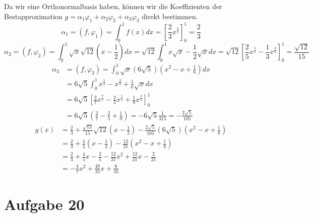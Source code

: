 \documentclass[10pt,a4paper]{article}
\begin{document}
Da wir eine Orthonormalbasis haben, können wir die Koeffizienten der Bestapproximation $g = \alpha_{1} \varphi_{1} + \alpha_{2} \varphi_{2} + \alpha_{3} \varphi_{3}$ direkt bestimmen.
\begin{equation}
  \alpha_{1} = (f, \varphi_{1}) = \int_{0}^{1} f(x) dx = [\frac{2}{3}x^{\frac{3}{2}}]_{0}^{1} = \frac{2}{3}
\end{equation}
\begin{equation}
  \alpha_{2} = (f, \varphi_{2}) = \int_{0}^{1} \sqrt{x}\sqrt{12}(x - \frac{1}{2}) dx = \sqrt{12} \int_{0}^{1} x \sqrt{x} - \frac{1}{2} \sqrt{x} dx = \sqrt{12} [\frac{2}{5}x^{\frac{5}{2}} - \frac{1}{3}x^{\frac{3}{2}}]_{0}^{1} = \frac{\sqrt{12}}{15}
\end{equation}
\begin{align*}
  \alpha_{3} & = (f, \varphi_{3}) = \int_{0}^{1} \sqrt{x}(6 \sqrt{5})(x^{2} - x + \frac{1}{6}) dx\\
  & = 6 \sqrt{5} \int_{0}^{1} x^{\frac{5}{2}} - x^{\frac{3}{2}} + \frac{1}{6} \sqrt{x} dx\\
  & = 6 \sqrt{5} [\frac{2}{7}x^{\frac{7}{2}} - \frac{2}{5} x^{\frac{5}{2}} + \frac{1}{9} x^{\frac{3}{2}}]_{0}^{1}\\
  & = 6 \sqrt{5} (\frac{2}{7} - \frac{2}{5} + \frac{1}{9}) = -6 \sqrt{5} \frac{1}{315} = -\frac{2 \sqrt{5}}{105}
\end{align*}
\begin{align*}
  g(x) & = \frac{2}{3} + \frac{\sqrt{12}}{15} \sqrt{12}(x - \frac{1}{2}) - \frac{2 \sqrt{5}}{105}(6 \sqrt{5})(x^{2} - x + \frac{1}{6})\\
  & = \frac{2}{3} + \frac{4}{5}(x - \frac{1}{2}) - \frac{12}{21}(x^{2} - x + \frac{1}{6})\\
  & = \frac{2}{3} + \frac{4}{5}x - \frac{2}{5} - \frac{12}{21}x^{2} + \frac{12}{21}x - \frac{2}{21}\\
  & = -\frac{4}{7}x^{2} + \frac{48}{35}x + \frac{6}{35}
\end{align*}

\section{Aufgabe 20}
\end{document}
